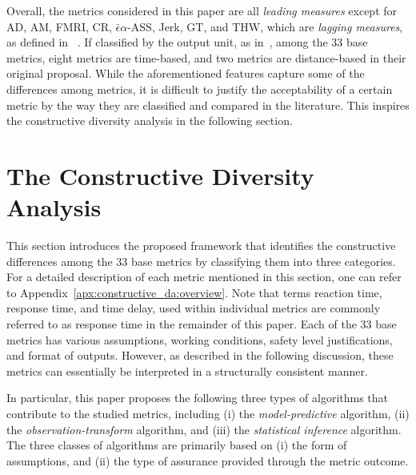 \documentclass[journal]{IEEEtran}
\begin{document}
Overall, the metrics considered in this paper are all \emph{leading measures} except for AD, AM, FMRI, CR, $\bar{\epsilon}\alpha$-ASS, Jerk, GT, and THW, which are \emph{lagging measures}, as defined in ~\cite{fraade2018measuring, griffor2019workshop}. If classified by the output unit, as in~\cite{elli2021evaluation,jammula2022evaluation}, among the 33 base metrics, eight metrics are time-based, and two metrics are distance-based in their original proposal. While the aforementioned features capture some of the differences among metrics, it is difficult to justify the acceptability of a certain metric by the way they are classified and compared in the literature. This inspires the constructive diversity analysis in the following section. 

\section{The Constructive Diversity Analysis}\label{sec:constructive_da}

This section introduces the proposed framework that identifies the constructive differences among the 33 base metrics by classifying them into three categories. For a detailed description of each metric mentioned in this section, one can refer to Appendix~\ref{apx:constructive_da:overview}. Note that terms reaction time, response time, and time delay, used within individual metrics are commonly referred to as response time in the remainder of this paper. Each of the 33 base metrics has various assumptions, working conditions, safety level justifications, and format of outputs. However, as described in the following discussion, these metrics can essentially be interpreted in a structurally consistent manner.

In particular, this paper proposes the following three types of algorithms that contribute to the studied metrics, including (i) the \emph{model-predictive} algorithm, (ii) the \emph{observation-transform} algorithm, and (iii) the \emph{statistical inference} algorithm. The three classes of algorithms are primarily based on (i) the form of assumptions, and (ii) the type of assurance provided through the metric outcome. 
\end{document}

